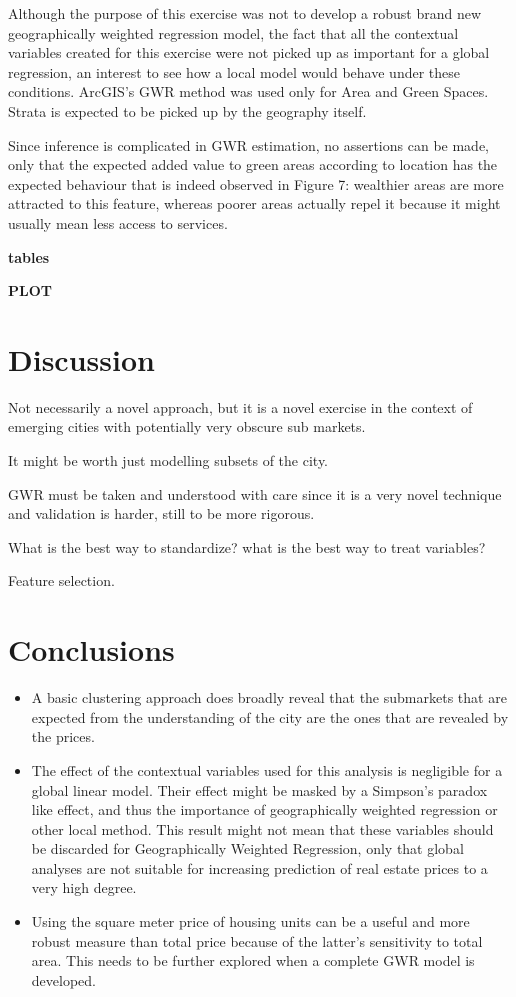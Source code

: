 \documentclass[journal]{IEEEtran}
\begin{document}
Although the purpose of this exercise was not to develop a robust brand new geographically weighted regression model, the fact that all the contextual variables created for this exercise were not picked up as important for a global regression, an interest to see how a local model would behave under these conditions. ArcGIS’s GWR method
was used only for Area and Green Spaces. Strata is expected to be picked up by the geography itself.

Since inference is complicated in GWR estimation, no assertions can be made, only that the expected added value to green areas according to location has the expected behaviour that is indeed observed
in Figure 7: wealthier areas are more attracted to this feature, whereas poorer areas actually repel it because it might usually mean less access to services.
	
\textbf{tables}

\textbf{PLOT}

\section{Discussion}

Not necessarily a novel approach, but it is a novel exercise in the context of emerging cities with potentially very obscure sub markets.

It might be worth just modelling subsets of the city.

GWR must be taken and understood with care since it is a very novel technique and validation is harder, still to be more rigorous.

What is the best way to standardize? what is the best way to treat variables?

Feature selection.

\section{Conclusions}

\begin{itemize}
\item A basic clustering approach does broadly reveal that the submarkets that are expected from the understanding of the city are the ones that are revealed by the prices.
\item The effect of the contextual variables used for this analysis is negligible for a global linear model. Their effect might be masked by a Simpson’s paradox like effect, and thus the importance of geographically weighted regression or other local method. This result
might not mean that these variables should be discarded for Geographically Weighted Regression, only that global analyses are not
suitable for increasing prediction of real estate prices to a very high degree.
\item Using the square meter price of housing units can be a useful and more robust measure than total price because of the latter’s sensitivity to total area. This needs to be further explored when a complete GWR model is developed.
\end{itemize}
\end{document}
